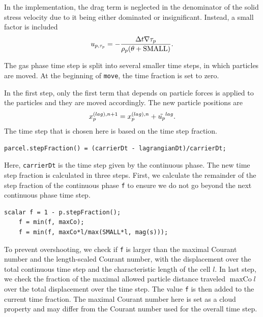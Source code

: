 In the \OF implementation, the drag term is neglected in the denominator of the solid stress velocity due to it being either dominated or insignificant. Instead, a small factor is included
\begin{equation}
    u_{p,\tau_p} = - \dfrac{\Delta t \nabla \tau_p}{\rho_p (\theta + \operatorname{SMALL})}.
\end{equation}

The gas phase time step is split into several smaller time steps, in which particles are moved. At the beginning of \lstinline|move|, the time fraction is set to zero.


In the first step, only the first term that depends on particle forces is applied to the particles and they are moved accordingly.
The new particle positions are
\begin{equation}
    x_p^{(lag),n+1} = x_p^{(lag),n} + \tilde{u_p}^{lag}.
\end{equation}
The time step that is chosen here is based on the time step fraction.
\ifkeepcode
\begin{lstlisting}[caption = kinematicCloud.C]
     parcel.stepFraction() = (carrierDt - lagrangianDt)/carrierDt;
\end{lstlisting}
\fi
Here, \lstinline|carrierDt| is the time step given by the continuous phase. 
The new time step fraction is calculated in three steps.
First, we calculate the remainder of the step fraction of the continuous phase \lstinline|f| to ensure we do not go beyond the next continuous phase time step. 
\begin{lstlisting}[caption = parcels/Templates/KinematicParcel/KinematicParcel.C, label = {code:stepFraction}]
    scalar f = 1 - p.stepFraction();
    f = min(f, maxCo);
    f = min(f, maxCo*l/max(SMALL*l, mag(s)));
\end{lstlisting}
To prevent overshooting, we check if \lstinline|f| is larger than the maximal Courant number
and the length-scaled Courant number,
with the displacement over the total continuous time step and the characteristic length of the cell $l$.
In last step, we check the fraction of the maximal allowed particle distance traveled $\operatorname{maxCo} l$ over the total displacement over the time step.
The value \lstinline|f| is then added to the current time fraction.
The maximal Courant number here is set as a cloud property and may differ from the Courant number used for the overall time step.

